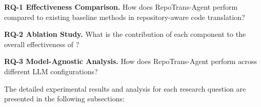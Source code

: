 \textbf{RQ-1 Effectiveness Comparison.} How does RepoTrans-Agent perform compared to existing baseline methods in repository-aware code translation?

\textbf{RQ-2 Ablation Study.} What is the contribution of each component to the overall effectiveness of \toolname?

\textbf{RQ-3 Model-Agnostic Analysis.} 
How does RepoTrans-Agent perform across different LLM configurations?

The detailed experimental results and analysis for each research question are presented in the following subsections:



